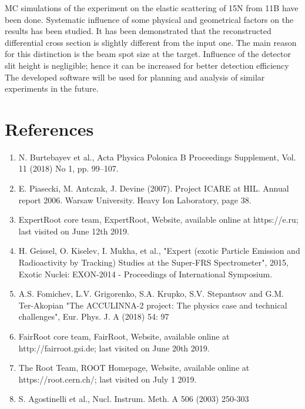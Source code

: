 \documentclass[%
 aip,
cp,  %
 amsmath,amssymb,%
 reprint,%
]{revtex4-2}
\begin{document}
MC simulations of the experiment on the elastic scattering of 15N from 11B have been done. Systematic influence of some physical and geometrical factors on the results has been studied. It has been demonstrated that the reconstructed differential cross section is slightly different from the input one. The main reason for this distinction is the beam spot size at the target. Influence of the detector slit height is negligible; hence it can be increased for better detection efficiency The developed software will be used for planning and analysis of similar experiments in the future.

\section{References}

\begin{enumerate}
\item N. Burtebayev et al., Acta Physica Polonica B Proceedings Supplement, Vol. 11 (2018) No 1, pp. 99–107.
\item E. Piasecki, M. Antczak, J. Devine (2007). Project ICARE at HIL. Annual report 2006. Warsaw University. Heavy       Ion Laboratory, page 38.
\item ExpertRoot core team, ExpertRoot, Website, available online at https://e.ru; last visited on June 12th 2019.
\item H. Geissel, O. Kiselev, I. Mukha, et al., "Expert (exotic Particle Emission and Radioactivity by Tracking) Studies at the Super-FRS Spectrometer", 2015, Exotic Nuclei: EXON-2014 - Proceedings of International Symposium.
\item A.S. Fomichev, L.V. Grigorenko, S.A. Krupko, S.V. Stepantsov and G.M. Ter-Akopian "The ACCULINNA-2 project: The physics case and technical challenges", Eur. Phys. J. A (2018) 54: 97
\item FairRoot core team, FairRoot, Website, available online at http://fairroot.gsi.de; last visited on June 20th 2019.
\item The Root Team, ROOT Homepage, Website, available online at https://root.cern.ch/; last visited on July 1 2019.
\item S. Agostinelli et al., Nucl. Instrum. Meth. A 506 (2003) 250-303

\end{enumerate}
\end{document}
